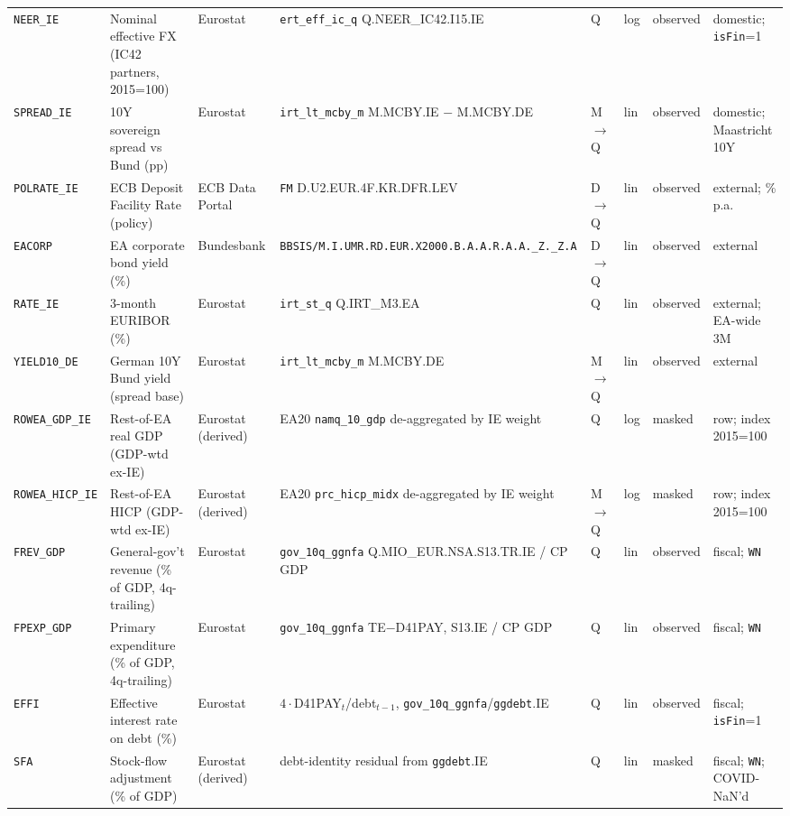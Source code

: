 \begin{longtable}{@{}p{}p{}p{}p{}p{}p{}p{}p{}@{}}
\texttt{NEER\_IE}  & Nominal effective FX (IC42 partners, 2015=100) & Eurostat & \texttt{ert\_eff\_ic\_q} Q.NEER\_IC42.I15.IE & Q & log & observed & domestic; \texttt{isFin}=1 \\
\texttt{SPREAD\_IE}& 10Y sovereign spread vs Bund (pp) & Eurostat & \texttt{irt\_lt\_mcby\_m} M.MCBY.IE $-$ M.MCBY.DE & M$\to$Q & lin & observed & domestic; Maastricht 10Y \\
\texttt{POLRATE\_IE}& ECB Deposit Facility Rate (policy) & ECB Data Portal & \texttt{FM} D.\allowbreak U2.\allowbreak EUR.\allowbreak 4F.\allowbreak KR.\allowbreak DFR.\allowbreak LEV & D$\to$Q & lin & observed & external; \% p.a. \\
\texttt{EACORP}    & EA corporate bond yield (\%) & Bundesbank & \texttt{BBSIS/\allowbreak M.\allowbreak I.\allowbreak UMR.\allowbreak RD.\allowbreak EUR.\allowbreak X2000.\allowbreak B.A.A.\allowbreak R.A.A.\allowbreak \_Z.\_Z.A} & D$\to$Q & lin & observed & external \\
\texttt{RATE\_IE}  & 3-month EURIBOR (\%) & Eurostat & \texttt{irt\_st\_q} Q.IRT\_M3.EA & Q & lin & observed & external; EA-wide 3M \\
\texttt{YIELD10\_DE}& German 10Y Bund yield (spread base) & Eurostat & \texttt{irt\_lt\_mcby\_m} M.MCBY.DE & M$\to$Q & lin & observed & external \\
\texttt{ROWEA\_GDP\_IE}  & Rest-of-EA real GDP (GDP-wtd ex-IE) & Eurostat (derived) & EA20 \texttt{namq\_10\_gdp} de-aggregated by IE weight & Q & log & masked & row; index 2015=100 \\
\texttt{ROWEA\_HICP\_IE} & Rest-of-EA HICP (GDP-wtd ex-IE) & Eurostat (derived) & EA20 \texttt{prc\_hicp\_midx} de-aggregated by IE weight & M$\to$Q & log & masked & row; index 2015=100 \\
\texttt{FREV\_GDP} & General-gov't revenue (\% of GDP, 4q-trailing) & Eurostat & \texttt{gov\_10q\_ggnfa} Q.\allowbreak MIO\_EUR.\allowbreak NSA.\allowbreak S13.\allowbreak TR.\allowbreak IE / CP GDP & Q & lin & observed & fiscal; \texttt{WN} \\
\texttt{FPEXP\_GDP}& Primary expenditure (\% of GDP, 4q-trailing) & Eurostat & \texttt{gov\_10q\_ggnfa} TE$-$D41PAY, S13.IE / CP GDP & Q & lin & observed & fiscal; \texttt{WN} \\
\texttt{EFFI}      & Effective interest rate on debt (\%) & Eurostat & $4\cdot$D41PAY$_t$/debt$_{t-1}$, \texttt{gov\_10q\_ggnfa}/\texttt{ggdebt}.IE & Q & lin & observed & fiscal; \texttt{isFin}=1 \\
\texttt{SFA}       & Stock-flow adjustment (\% of GDP) & Eurostat (derived) & debt-identity residual from \texttt{ggdebt}.IE & Q & lin & masked & fiscal; \texttt{WN}; COVID-NaN'd \\

\end{longtable}
